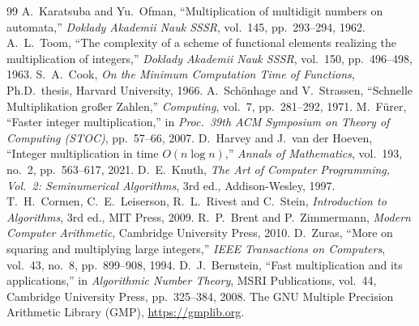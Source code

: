 \documentclass[11pt,a4paper]{article}
\begin{document}
\begin{thebibliography}{99}\small
{} A.~Karatsuba and Yu.~Ofman, ``Multiplication of multidigit numbers on automata,'' \emph{Doklady Akademii Nauk SSSR}, vol.~145, pp.~293--294, 1962.
 A.~L.~Toom, ``The complexity of a scheme of functional elements realizing the multiplication of integers,'' \emph{Doklady Akademii Nauk SSSR}, vol.~150, pp.~496--498, 1963.
 S.~A.~Cook, \emph{On the Minimum Computation Time of Functions}, Ph.D.\ thesis, Harvard University, 1966.
 A.~Sch\"onhage and V.~Strassen, ``Schnelle Multiplikation gro\ss er Zahlen,'' \emph{Computing}, vol.~7, pp.~281--292, 1971.
 M.~F\"urer, ``Faster integer multiplication,'' in \emph{Proc.\ 39th ACM Symposium on Theory of Computing (STOC)}, pp.~57--66, 2007.
 D.~Harvey and J.~van der Hoeven, ``Integer multiplication in time $O(n\log n)$,'' \emph{Annals of Mathematics}, vol.~193, no.~2, pp.~563--617, 2021.
 D.~E.~Knuth, \emph{The Art of Computer Programming, Vol.~2: Seminumerical Algorithms}, 3rd ed., Addison-Wesley, 1997.
 T.~H.~Cormen, C.~E.~Leiserson, R.~L.~Rivest and C.~Stein, \emph{Introduction to Algorithms}, 3rd ed., MIT Press, 2009.
 R.~P.~Brent and P.~Zimmermann, \emph{Modern Computer Arithmetic}, Cambridge University Press, 2010.
 D.~Zuras, ``More on squaring and multiplying large integers,'' \emph{IEEE Transactions on Computers}, vol.~43, no.~8, pp.~899--908, 1994.
 D.~J.~Bernstein, ``Fast multiplication and its applications,'' in \emph{Algorithmic Number Theory}, MSRI Publications, vol.~44, Cambridge University Press, pp.~325--384, 2008.
 The GNU Multiple Precision Arithmetic Library (GMP), \url{https://gmplib.org}.
\end{thebibliography}
\end{document}
